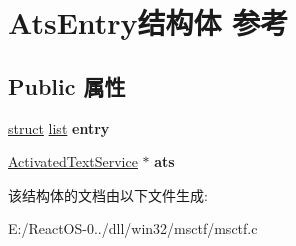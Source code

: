 \hypertarget{struct_ats_entry}{}\section{Ats\+Entry结构体 参考}
\label{struct_ats_entry}
\subsection*{Public 属性}
\begin{DoxyCompactItemize}
\item 
\mbox{\label{struct_ats_entry_a686ce54c9f9cfb7d507dd6676f49c45e}} 
\hyperlink{interfacestruct}{struct} \hyperlink{classlist}{list} {\bfseries entry}
\item 
\mbox{\label{struct_ats_entry_adf92b99ed8b7fba5cea91f3c7e561e6d}} 
\hyperlink{struct_activated_text_service}{Activated\+Text\+Service} $\ast$ {\bfseries ats}
\end{DoxyCompactItemize}


该结构体的文档由以下文件生成\+:\begin{DoxyCompactItemize}
\item 
E\+:/\+React\+O\+S-\/0../dll/win32/msctf/msctf.\+c\end{DoxyCompactItemize}
